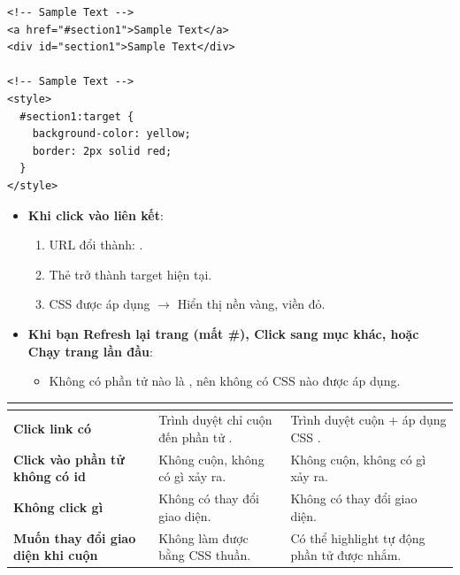 \begin{codeWindow}
\begin{lstlisting}[language=HTML5]
<!-- Sample Text -->
<a href="#section1">Sample Text</a>
<div id="section1">Sample Text</div>

<!-- Sample Text -->
<style>
  #section1:target {
    background-color: yellow;
    border: 2px solid red;
  }
</style>
\end{lstlisting}
\end{codeWindow}

\begin{browserWindow}
\sffamily\small
\begin{itemize}[leftmargin=1.5em, itemsep=3pt, parsep=0pt]
    \item \textbf{Khi click vào liên kết}:
    \begin{enumerate}[leftmargin=1.2em, itemsep=1pt]
        \item URL đổi thành: .
        \item Thẻ  trở thành target hiện tại.
        \item CSS  được áp dụng $\rightarrow$ Hiển thị nền vàng, viền đỏ.
    \end{enumerate}
    \item \textbf{Khi bạn Refresh lại trang (mất \#), Click sang mục khác, hoặc Chạy trang lần đầu}:
    \begin{itemize}[leftmargin=1.2em, itemsep=1pt]
        \item Không có phần tử nào là , nên không có CSS  nào được áp dụng.
    \end{itemize}
\end{itemize}
\end{browserWindow}

\begin{prettyTableBox}
\sffamily\small
\begin{tabularx}{\linewidth}{|>{\sffamily\bfseries}K{3.8cm}|>{\sffamily}K{4.2cm}|Z|}
\hline
{}  &  &  \\
\hline
Click link có  & Trình duyệt chỉ cuộn đến phần tử . & Trình duyệt cuộn + áp dụng CSS . \\
\hline
Click vào phần tử không có id & Không cuộn, không có gì xảy ra. & Không cuộn, không có gì xảy ra. \\
\hline
Không click gì & Không có thay đổi giao diện. & Không có thay đổi giao diện. \\
\hline
Muốn thay đổi giao diện khi cuộn & Không làm được bằng CSS thuần. & Có thể highlight tự động phần tử được nhắm. \\
\hline
\end{tabularx}
\end{prettyTableBox}

